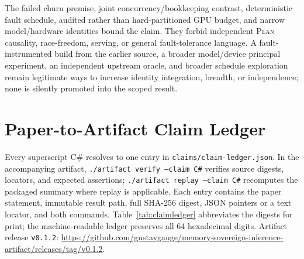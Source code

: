 \documentclass[letterpaper,twocolumn,10pt]{article}
\newcommand{\Plan}{\textsc{Plan}\xspace}
\begin{document}
The failed churn premise, joint concurrency/bookkeeping contrast, deterministic
fault schedule, audited rather than hard-partitioned GPU budget, and narrow
model/hardware identities bound the claim.  They forbid independent \Plan
causality, race-freedom, serving, or general fault-tolerance language.  A
fault-instrumented build from the earlier source, a broader model/device
principal experiment, an independent
upstream oracle, and broader schedule exploration remain legitimate ways to
increase identity integration, breadth, or independence; none is silently
promoted into the scoped result.

\appendix
\additionalexperiments
\negativeresults

\section{Paper-to-Artifact Claim Ledger}
\label{sec:claimledger}

Every superscript \textsf{C\#} resolves to one entry in
\texttt{claims/claim-ledger.json}.  In the accompanying artifact,
\texttt{./artifact verify --claim C\#} verifies source digests, locators, and
expected assertions; \texttt{./artifact replay --claim C\#} recomputes the
packaged summary where replay is applicable.  Each entry contains the paper
statement, immutable result path, full SHA-256 digest, JSON pointers or a text
locator, and both commands.  Table~\ref{tab:claimledger} abbreviates the digests
for print; the machine-readable ledger preserves all 64 hexadecimal digits.
Artifact release \texttt{v0.1.2}: \url{https://github.com/gustavgauge/memory-sovereign-inference-artifact/releases/tag/v0.1.2}.
\end{document}
